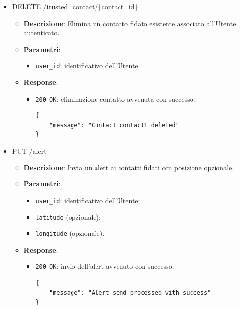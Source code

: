 \documentclass[a4paper,12pt]{article}
\newcommand{\code}[1]{{\ttfamily\textcolor{purple!85!black}{#1}}}
\begin{document}
\begin{itemize}
    \item \code{DELETE /trusted\_contact/\{contact\_id\}}
        \begin{itemize}
            \item \textbf{Descrizione}: Elimina un contatto fidato esistente associato all’Utente autenticato.
            
            \item \textbf{Parametri}:
            \begin{itemize}
                \item \texttt{user\_id}: identificativo dell’Utente.
            \end{itemize}

            \item \textbf{Response}:
            \begin{itemize}
                \item \texttt{200 OK}: eliminazione contatto avvenuta con successo.
\begin{verbatim}
{
    "message": "Contact contact1 deleted"
}
\end{verbatim}
            \end{itemize}
        \end{itemize}


    \item \code{PUT /alert}
        \begin{itemize}
            \item \textbf{Descrizione}: Invia un alert ai contatti fidati con posizione opzionale.

            \item \textbf{Parametri}:
            \begin{itemize}
                \item \texttt{user\_id}: identificativo dell’Utente;
                \item \texttt{latitude} (opzionale);
                \item \texttt{longitude} (opzionale).
            \end{itemize}

            \item \textbf{Response}:
            \begin{itemize}
                \item \texttt{200 OK}: invio dell'alert avvenuto con successo.
\begin{verbatim}
{
    "message": "Alert send processed with success"
}
\end{verbatim}
            \end{itemize}


\end{itemize}
\end{itemize}
\end{document}
